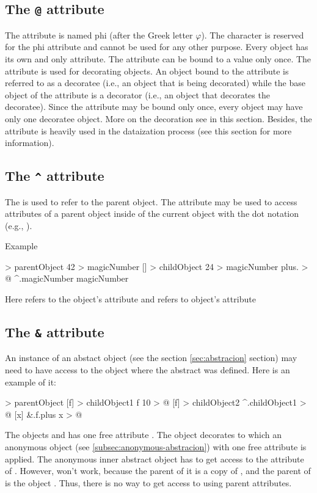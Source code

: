 \documentclass[12pt]{book}
\begin{document}
\subsection{The \texttt{@} attribute} \label{subsec:@-attr}
The  attribute is named phi (after the Greek letter $\varphi$). The  character is reserved for the phi attribute and cannot be used for any other purpose. Every object has its own and only  attribute. The  attribute can be bound to a value only once.
The  attribute is used for decorating objects. An object bound to the  attribute is referred to as a decoratee (i.e., an object that is being decorated) while the base object of the  attribute is a decorator (i.e., an object that decorates the decoratee). Since the  attribute may be bound only once, every object may have only one decoratee object. More on the decoration see in this section.
Besides, the  attribute is heavily used in the dataization process (see this section for more information).

\subsection{The \texttt{\^} attribute}
The  \ff{^} is used to refer to the parent object.
The \ff{^} attribute may be used to access attributes of a parent object inside of the current object with the dot notation (e.g., ).

Example
\begin{ffcode}
[] > parentObject
  42 > magicNumber
  [] > childObject
    24 > magicNumber
    plus. > @
      ^.magicNumber
      magicNumber
\end{ffcode}
Here  refers to the  object's attribute and  refers to  object's attribute

\subsection{The \texttt{\&} attribute}
An instance of an abstact object (see the section \ref{sec:abstracion} section) may need to have access to the
object where the abstract was defined. Here is an example of it:
\begin{ffcode}
[] > parentObject
  [f] > childObject1
    f 10 > @
  [f] > childObject2
    ^.childObject1 > @
      [x]
        &.f.plus x > @
\end{ffcode}
The objects  and  has one free attribute . The object  decorates  to which an anonymous object (see \ref{subsec:anonymous-abstracion}) with one free attribute  is applied. The anonymous inner abstract object has to get access to the attribute  of . However,  won't work, because the parent of it is a copy of , and the parent of  is the object . Thus, there is no way to get access to  using parent attributes.
\end{document}
